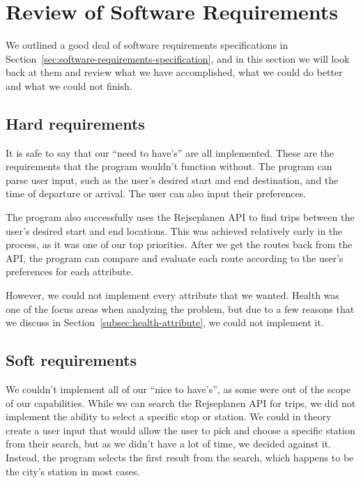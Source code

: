 \section{Review of Software Requirements}\label{sec:review-of-software-requirements}

We outlined a good deal of software requirements specifications in Section~\ref{sec:software-requirements-specification},
and in this section we will look back at them and review what we have accomplished, what we could do better and what we
could not finish.

\subsection{Hard requirements}\label{subsec:functional-requirements}

It is safe to say that our ``need to have's'' are all implemented.
These are the requirements that the program wouldn't function without.
The program can parse user input, such as the user's desired start and end destination, and the time of departure or
arrival.
The user can also input their preferences.

The program also successfully uses the Rejseplanen API to find trips between the user's desired start and end locations.
This was achieved relatively early in the process, as it was one of our top priorities.
After we get the routes back from the API, the program can compare and evaluate each route according to the user's
preferences for each attribute.

However, we could not implement every attribute that we wanted.
Health was one of the focus areas when analyzing the problem, but due to a few reasons that we discuss in
Section~\ref{subsec:health-attribute}, we could not implement it.

\subsection{Soft requirements}\label{subsec:non-functional-requirements}

We couldn't implement all of our ``nice to have's'', as some were out of the scope of our capabilities.
While we can search the Rejseplanen API for trips, we did not implement the ability to select a specific stop or station.
We could in theory create a user input that would allow the user to pick and choose a specific station from their search,
but as we didn't have a lot of time, we decided against it.
Instead, the program selects the first result from the search, which happens to be the city's station in most cases.

